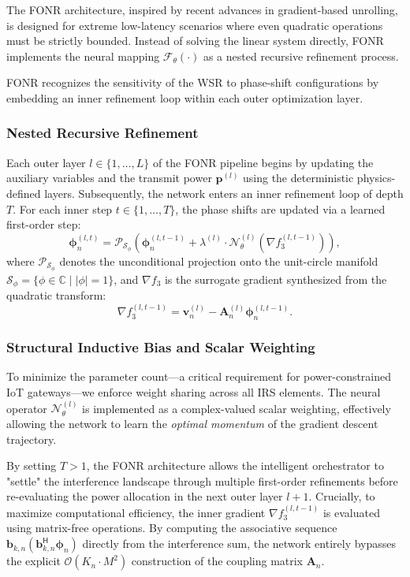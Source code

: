 \documentclass[journal]{IEEEtran}
\newcommand{\herm}{^{\mathsf{H}}}
\begin{document}
The FONR architecture, inspired by recent advances in gradient-based unrolling, is designed for extreme low-latency scenarios where even quadratic operations must be strictly bounded. Instead of solving the linear system directly, FONR implements the neural mapping $\mathcal{F}_{\theta}(\cdot)$ as a nested recursive refinement process. 

FONR recognizes the sensitivity of the WSR to phase-shift configurations by embedding an inner refinement loop within each outer optimization layer.

\subsubsection{Nested Recursive Refinement}
Each outer layer $l \in \{1, \dots, L\}$ of the FONR pipeline begins by updating the auxiliary variables and the transmit power $\mathbf{p}^{(l)}$ using the deterministic physics-defined layers. Subsequently, the network enters an inner refinement loop of depth $T$. For each inner step $t \in \{1, \dots, T\}$, the phase shifts are updated via a learned first-order step:
\begin{equation}
    \boldsymbol{\phi}_n^{(l, t)} = \mathcal{P}_{\mathcal{S}_{\phi}} \left( \boldsymbol{\phi}_n^{(l, t-1)} + \lambda^{(l)} \cdot \mathcal{N}_{\theta}^{(l)} \left( \nabla f_3^{(l, t-1)} \right) \right),
\end{equation}
where $\mathcal{P}_{\mathcal{S}_{\phi}}$ denotes the unconditional projection onto the unit-circle manifold $\mathcal{S}_{\phi} = \{ \phi \in \mathbb{C} \mid |\phi| = 1 \}$, and $\nabla f_3$ is the surrogate gradient synthesized from the quadratic transform:
\begin{equation}
    \nabla f_3^{(l, t-1)} = \mathbf{v}_n^{(l)} - \mathbf{A}_n^{(l)} \boldsymbol{\phi}_n^{(l, t-1)}.
\end{equation}

\subsubsection{Structural Inductive Bias and Scalar Weighting}
To minimize the parameter count—a critical requirement for power-constrained IoT gateways—we enforce weight sharing across all IRS elements. The neural operator $\mathcal{N}_{\theta}^{(l)}$ is implemented as a complex-valued scalar weighting, effectively allowing the network to learn the \textit{optimal momentum} of the gradient descent trajectory. 

By setting $T > 1$, the FONR architecture allows the intelligent orchestrator to "settle" the interference landscape through multiple first-order refinements before re-evaluating the power allocation in the next outer layer $l+1$. Crucially, to maximize computational efficiency, the inner gradient $\nabla f_3^{(l, t-1)}$ is evaluated using matrix-free operations. By computing the associative sequence $\mathbf{b}_{k,n} (\mathbf{b}_{k,n}\herm \boldsymbol{\phi}_n)$ directly from the interference sum, the network entirely bypasses the explicit $\mathcal{O}(K_n \cdot M^2)$ construction of the coupling matrix $\mathbf{A}_n$. 
\end{document}

